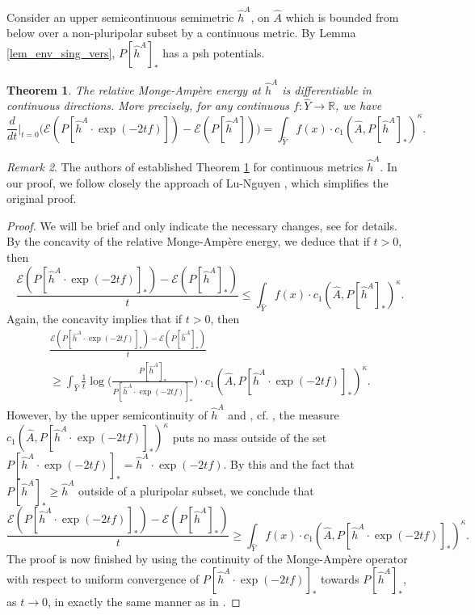 \documentclass[12pt]{article}
\numberwithin{equation}{section}
\theoremstyle{theorem}
\newtheorem{thm}{Theorem}[section]
\theoremstyle{definition}
\theoremstyle{remark}
\newtheorem{rem}[thm]{Remark}
\newcommand{\real}{\mathbb{R}}
\begin{document}
	Consider an upper semicontinuous semimetric $\widehat{h}^A$, on $\widehat{A}$ which is bounded from below over a non-pluripolar subset by a continuous metric.
	By Lemma \ref{lem_env_sing_vers}, $P[\widehat{h}^A]_*$ has a psh potentials.	
	\begin{thm}\label{thm_diff_sing}
		The relative Monge-Ampère energy at $\widehat{h}^A$ is differentiable in continuous directions.
		More precisely, for any continuous $f: \widehat{Y} \to \real$, we have
		\begin{equation}
			\frac{d}{dt}\Big|_{t = 0}
			\Big(
			\mathscr{E}(P[\widehat{h}^A \cdot \exp(- 2t f)])
			-
			\mathscr{E}(P[\widehat{h}^A])
			\Big)
			=
			\int_{\widehat{Y}} f(x) \cdot c_1(\widehat{A}, P[\widehat{h}^A]_*)^{\kappa}.
		\end{equation}
	\end{thm}
	\begin{rem}
		The authors of \cite{BermanBouckBalls} established Theorem \ref{thm_diff_sing} for continuous metrics  $\widehat{h}^A$.
		In our proof, we follow closely the approach of Lu-Nguyen \cite{LuNgueynDifferent}, which simplifies the original proof.
	\end{rem}
	\begin{proof}
		We will be brief and only indicate the necessary changes, see \cite[Theorem 11.11]{GuedjZeriahBook} for details.
		By the concavity of the relative Monge-Ampère energy, we deduce that if $t > 0$, then
		\begin{equation}
			\frac{\mathscr{E}(P[\widehat{h}^A \cdot \exp(- 2t f)]_*) - \mathscr{E}(P[\widehat{h}^A]_*)}{t}
			\leq
			\int_{\widehat{Y}} f(x) \cdot c_1(\widehat{A}, P[\widehat{h}^A]_*)^{\kappa}.
		\end{equation}
		Again, the concavity implies that if $t > 0$, then
		\begin{multline}
			\frac{\mathscr{E}(P[\widehat{h}^A \cdot \exp(- 2t f)]_*) - \mathscr{E}(P[\widehat{h}^A]_*)}{t}
			\\
			\geq
			\int_{\widehat{Y}} \frac{1}{t} \log \Big(\frac{P[\widehat{h}^A]_*}{P[\widehat{h}^A \cdot \exp(- 2t f)]_*} \Big) \cdot c_1(\widehat{A}, P[\widehat{h}^A \cdot \exp(- 2 t f)]_*)^{\kappa}.
		\end{multline}
		However, by the upper semicontinuity of $\widehat{h}^A$ and \cite[Lemma 2.3]{GuedjLuZeriahEnv}, cf. \cite{BedfordTaylor}, the measure $c_1(\widehat{A}, P[\widehat{h}^A \cdot \exp(- 2 t f)]_*)^{\kappa}$ puts no mass  outside of the set $P[\widehat{h}^A \cdot \exp(- 2t f)]_* = \widehat{h}^A \cdot \exp(- 2t f)$.
		By this and the fact that $P[\widehat{h}^A]_* \geq \widehat{h}^A$ outside of a pluripolar subset, we conclude that 
		\begin{equation}
			\frac{\mathscr{E}(P[\widehat{h}^A \cdot \exp(- 2t f)]_*) - \mathscr{E}(P[\widehat{h}^A]_*)}{t}
			\geq
			\int_{\widehat{Y}} f(x) \cdot c_1(\widehat{A}, P[\widehat{h}^A \cdot \exp(- 2 t f)]_*)^{\kappa}.
		\end{equation}
		The proof is now finished by using the continuity of the Monge-Ampère operator with respect to uniform convergence of $P[\widehat{h}^A \cdot \exp(- 2 t f)]_*$ towards $P[\widehat{h}^A]_*$, as $t \to 0$, in exactly the same manner as in \cite[Theorem 11.11]{GuedjZeriahBook}.
	\end{proof}
\end{document}
